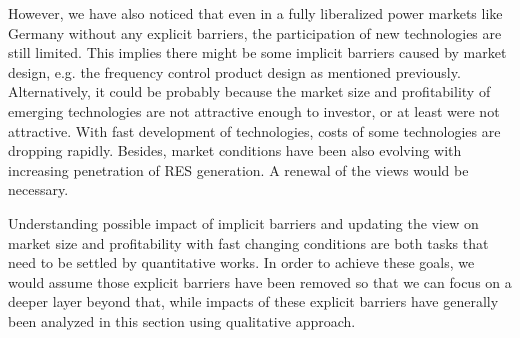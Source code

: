 However, we have also noticed that even in a fully liberalized power markets like Germany without any explicit barriers, the participation of new technologies are still limited. This implies there might be some implicit barriers caused by market design, e.g. the frequency control product design as mentioned previously. Alternatively, it could be probably because the market size and profitability of emerging technologies are not attractive enough to investor, or at least were not attractive. With fast development of technologies, costs of some technologies are dropping rapidly. Besides, market conditions have been also evolving with increasing penetration of RES generation. A renewal of the views would be necessary. 

Understanding possible impact of implicit barriers and updating the view on market size and profitability with fast changing conditions are both tasks that need to be settled by quantitative works. In order to achieve these goals, we would assume those explicit barriers have been removed so that we can focus on a deeper layer beyond that, while impacts of these explicit barriers have generally been analyzed in this section using qualitative approach.





